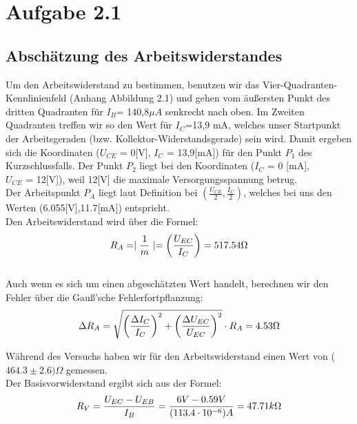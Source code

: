 \section{Aufgabe 2.1}
\subsection{Abschätzung des Arbeitswiderstandes}

Um den Arbeitswiderstand zu bestimmen, benutzen wir das Vier-Quadranten-Kennlinienfeld (Anhang Abbildung 2.1) und gehen vom äußersten Punkt des dritten Quadranten für \(I_B\)= 140,8\(\mu A\) senkrecht nach oben. Im Zweiten Quadranten treffen wir so den Wert für \(I_C\)=13,9 mA, welches unser Startpunkt der Arbeitsgeraden (bzw. Kollektor-Widerstandsgerade) sein wird. Damit ergeben sich die Koordinaten (\(U_{CE}\) = 0[V], \(I_{C}\) = 13,9[mA]) für den Punkt \(P_1\) des Kurzschlussfalls. Der Punkt \(P_2\) liegt bei den Koordinaten (\(I_{C}\) = 0 [mA],\\
\(U_{CE}\) = 12[V]), weil 12[V] die maximale Versorgungsspannung betrug.\\
Der Arbeitspunkt \(P_{A}\) liegt laut Definition bei \(\left(\frac{U_{CE}}{2}, \frac{I_{C}}{2}\right)\), welches bei uns den Werten (6.055[V],11.7[mA]) entspricht.\\

Den Arbeitswiderstand wird über die Formel:
\begin{equation}
\notag
R_{A}=\mid \frac{1}{m}\mid = \left(\frac{U_{EC}}{I_C}\right) = 517.54 \Omega
\end{equation}\\
Auch wenn es sich um einen abgeschätzten Wert handelt, berechnen wir den Fehler über die Gauß'sche Fehlerfortpflanzung:
\begin{equation}
\notag
\Delta R_{A}=\sqrt{\left(\frac{\Delta I_C}{I_C}\right)^2+\left(\frac{\Delta U_{EC}}{U_{EC}}\right)^2}\cdot R_{A} = 4.53\Omega
\end{equation}

Während des Versuchs haben wir für den Arbeitswiderstand einen Wert von (\(464.3\pm 2.6)\Omega\) gemessen.\\

Der Basisvorwiderstand ergibt sich aus der Formel:
\begin{equation}
\notag
R_V= \frac{U_{EC}-U_{EB}}{I_B}=\frac{6V-0.59V}{(113.4\cdot 10^{-6})A}=47.71k\Omega
\end{equation}